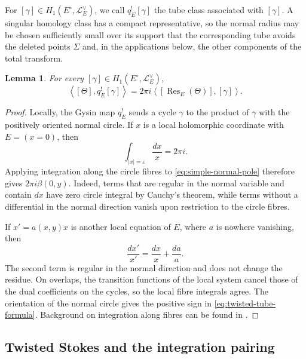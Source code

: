 \documentclass[12pt]{amsart}
\numberwithin{equation}{section}
\theoremstyle{plain}
\newtheorem{lemma}[theorem]{Lemma}
\theoremstyle{definition}
\theoremstyle{remark}
\theoremstyle{definition}
\DeclareMathOperator{\Res}{Res}
\newcommand{\Lcal}{\mathscr L}
\begin{document}
For $[\gamma]\in H_1(E^\circ,\Lcal_E^\vee)$, we call $q_E^![\gamma]$ the tube class associated with $[\gamma]$. A singular homology class has a compact representative, so the normal radius may be chosen sufficiently small over its support that the corresponding tube avoids the deleted points $\Sigma$ and, in the applications below, the other components of the total transform.

\begin{lemma}\label{lem:twisted-tube-formula}
For every $[\gamma]\in H_1(E^\circ,\Lcal_E^\vee)$,
\begin{equation}\label{eq:twisted-tube-formula}
\left\langle[\Theta],q_E^![\gamma]\right\rangle=2\pi i\left\langle[\Res_E(\Theta)],[\gamma]\right\rangle.
\end{equation}
\end{lemma}

\begin{proof}
Locally, the Gysin map $q_E^!$ sends a cycle $\gamma$ to the product of $\gamma$ with the positively oriented normal circle. If $x$ is a local holomorphic coordinate with $E=(x=0)$, then
\begin{equation*}
\int_{|x|=\varepsilon}\frac{dx}{x}=2\pi i.
\end{equation*}
Applying integration along the circle fibres to \eqref{eq:simple-normal-pole} therefore gives $2\pi i\beta(0,y)$. Indeed, terms that are regular in the normal variable and contain $dx$ have zero circle integral by Cauchy's theorem, while terms without a differential in the normal direction vanish upon restriction to the circle fibres. 

If $x'=a(x,y)x$ is another local equation of $E$, where $a$ is nowhere vanishing, then
\begin{equation*}
\frac{dx'}{x'}=\frac{dx}{x}+\frac{da}{a}.
\end{equation*}
The second term is regular in the normal direction and does not change the residue. On overlaps, the transition functions of the local system cancel those of the dual coefficients on the cycles, so the local fibre integrals agree. The orientation of the normal circle gives the positive sign in \eqref{eq:twisted-tube-formula}. Background on integration along fibres can be found in \cite[Chapter~I, Section~6]{BottTu1982}.
\end{proof}

\subsection{Twisted Stokes and the integration pairing}
\end{document}
